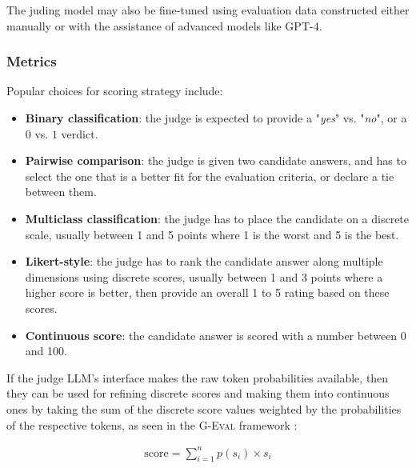 \documentclass[noindent,nohyp,parspace,titlepage,twoside,12pt]{article}
\begin{document}
        The juding model may also be fine-tuned using evaluation data
        constructed either manually or with the assistance of advanced models
        like GPT-4.

      \subsubsection{Metrics}

        Popular choices for scoring strategy include:

        \begin{itemize}
          \item \textbf{Binary classification}: the judge is expected to
                provide a "\emph{yes}" vs. "\emph{no}", or a $0$ vs. $1$
                verdict.

          \item \textbf{Pairwise comparison}: the judge is given two candidate
                answers, and has to select the one that is a better fit for the
                evaluation criteria, or declare a tie between them.

          \item \textbf{Multiclass classification}: the judge has to place the
                candidate on a discrete scale, usually between 1 and 5 points
                where 1 is the worst and 5 is the best.

          \item \textbf{Likert-style}: the judge has to rank the candidate
                answer along multiple dimensions using discrete scores, usually
                between 1 and 3 points where a higher score is better, then
                provide an overall 1 to 5 rating based on these scores.

          \item \textbf{Continuous score}: the candidate answer is scored with
                a number between 0 and 100.
        \end{itemize}

        If the judge LLM's interface makes the raw token probabilities
        available, then they can be used for refining discrete scores and
        making them into continuous ones by taking the sum of the discrete
        score values weighted by the probabilities of the respective tokens, as
        seen in the \textsc{G-Eval} framework \cite{geval}:

        \begin{align*}
          \text{score} = \sum_{i=1}^n p(s_i) \times s_i
        \end{align*}
\end{document}
